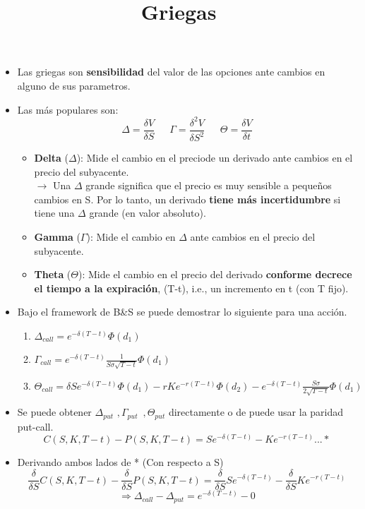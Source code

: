 \documentclass[12pts]{extarticle}
\author{}
\date{}
\title{Griegas}
\begin{document}
\maketitle
\begin{itemize}
\item Las griegas son \textbf{sensibilidad} del valor de las opciones ante cambios en alguno de sus parametros. 
\item Las más populares son: 
$$\Delta=\frac{\delta V}{\delta S} \, \, \,\, \, \, \, \, \, \Gamma=\frac{\delta^2 V}{\delta S^2} \, \, \, \, \, \, \, \, \ \Theta=\frac{\delta V}{\delta t}$$ 
\begin{itemize}
\item \textbf{Delta} ($\Delta$): Mide el cambio en el preciode un derivado ante cambios en el precio del subyacente.\\ $\rightarrow$ Una $\Delta$ grande significa que el precio es muy sensible a pequeños cambios en S. Por lo tanto, un derivado \textbf{tiene más incertidumbre} si tiene una $\Delta$ grande (en valor absoluto).
\item \textbf{Gamma} ($\Gamma$): Mide el cambio en $\Delta$ ante cambios en el precio del subyacente.
\item \textbf{Theta} ($\Theta$): Mide el cambio en el precio del derivado \textbf{conforme decrece el tiempo a la expiración}, (T-t), i.e., un incremento en t (con T fijo). 
\end{itemize}
\item Bajo el framework de B\&S se puede demostrar lo siguiente para una acción. 
\begin{enumerate}
\item $\Delta_{call}=e^{-\delta(T-t)}\Phi (d_1)$
\item $\Gamma_{call}=e^{-\delta(T-t)}\frac{1}{S\sigma\sqrt{T-t}}\Phi (d_1)$
\item $\Theta_{call}=\delta Se^{-\delta(T-t)}\Phi (d_1)-rKe^{-r(T-t)}\Phi(d_2)-e^{-\delta(T-t)}\frac{S\sigma}{2\sqrt{T-t}}\Phi(d_1)$
\end{enumerate}
\item Se puede obtener $\Delta_{put} \, \, , \Gamma_{put} \, \, \, , \Theta_{put}$ directamente o de puede usar la paridad put-call. 
$$C(S,K,T-t)-P(S,K,T-t)=Se^{-\delta(T-t)}-Ke^{-r(T-t)}...*$$
\item Derivando ambos lados de * (Con respecto a S) 
$$\frac{\delta}{\delta S}C(S,K,T-t)-\frac{\delta}{\delta S}P(S,K,T-t)=\frac{\delta}{\delta S}Se^{-\delta(T-t)}-\frac{\delta}{\delta S}Ke^{-r(T-t)}$$
$$\Rightarrow \Delta_{call}-\Delta_{put}=e^{-\delta(T-t)}-0$$

\end{itemize}
\end{document}

